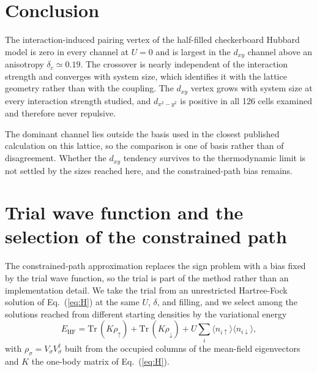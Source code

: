 \documentclass[aps,prb,reprint,superscriptaddress,amsmath,amssymb,floatfix]{revtex4-2}
\begin{document}
\section{Conclusion}
The interaction-induced pairing vertex of the half-filled checkerboard Hubbard
model is zero in every channel at $U=0$ and is largest in the $d_{xy}$ channel
above an anisotropy $\delta_c \simeq 0.19$. The crossover is nearly independent
of the interaction strength and converges with system size, which identifies it
with the lattice geometry rather than with the coupling. The $d_{xy}$ vertex
grows with system size at every interaction strength studied, and $d_{x^2-y^2}$
is positive in all 126 cells examined and therefore never repulsive.

The dominant channel lies outside the basis used in the closest published
calculation on this lattice, so the comparison is one of basis rather than of
disagreement. Whether the $d_{xy}$ tendency survives to the thermodynamic limit
is not settled by the sizes reached here, and the constrained-path bias remains.

\appendix

\section{Trial wave function and the selection of the constrained path}
\label{app:trial}

The constrained-path approximation replaces the sign problem with a bias fixed
by the trial wave function, so the trial is part of the method rather than an
implementation detail. We take the trial from an unrestricted Hartree-Fock
solution of Eq.~(\ref{eq:H}) at the same $U$, $\delta$, and filling, and we
select among the solutions reached from different starting densities by the
variational energy
\begin{equation}
E_{\mathrm{HF}} = \mathrm{Tr}\,(K \rho_{\uparrow}) + \mathrm{Tr}\,(K \rho_{\downarrow})
                + U \sum_i \langle n_{i\uparrow}\rangle \langle n_{i\downarrow}\rangle ,
\label{eq:ehf}
\end{equation}
with $\rho_{\sigma} = V_{\sigma} V_{\sigma}^{\dagger}$ built from the occupied
columns of the mean-field eigenvectors and $K$ the one-body matrix of
Eq.~(\ref{eq:H}).
\end{document}
